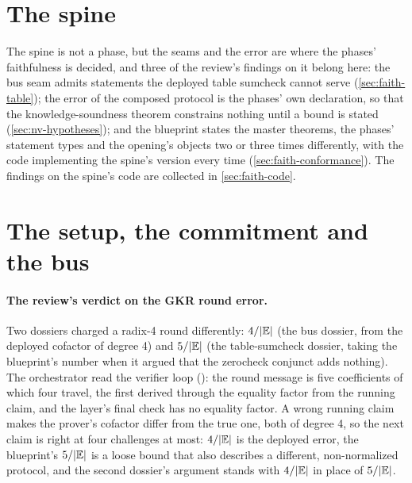\section{The spine}\label{sec:faith-spine}

The spine is not a phase, but the seams and the error are where the phases' faithfulness is
decided, and three of the review's findings on it belong here: the bus seam admits statements
the deployed table sumcheck cannot serve (\cref{sec:faith-table}); the error of the composed
protocol is the phases' own declaration, so that the knowledge-soundness theorem constrains
nothing until a bound is stated (\cref{sec:nv-hypotheses}); and the blueprint states the
master theorems, the phases' statement types and the opening's objects two or three times
differently, with the code implementing the spine's version every time
(\cref{sec:faith-conformance}). The findings on the spine's code are collected in
\cref{sec:faith-code}.

\section{The setup, the commitment and the bus}\label{sec:faith-bus}


\paragraph{The review's verdict on the GKR round error.} Two dossiers charged a radix-4 round
differently: $4/\lvert \mathbb{E}\rvert$ (the bus dossier, from the deployed cofactor of degree 4) and
$5/\lvert \mathbb{E}\rvert$ (the table-sumcheck dossier, taking the blueprint's number when it argued that the
zerocheck conjunct adds nothing). The orchestrator read the verifier loop
(): the round message is five coefficients of which
four travel, the first derived through the equality factor from the running claim, and the
layer's final check has no equality factor. A wrong running claim makes the prover's cofactor
differ from the true one, both of degree 4, so the next claim is right at four challenges at
most: $4/\lvert \mathbb{E}\rvert$ is the deployed error, the blueprint's $5/\lvert \mathbb{E}\rvert$ is a loose bound that
also describes a different, non-normalized protocol, and the second dossier's argument stands
with $4/\lvert \mathbb{E}\rvert$ in place of $5/\lvert \mathbb{E}\rvert$.

